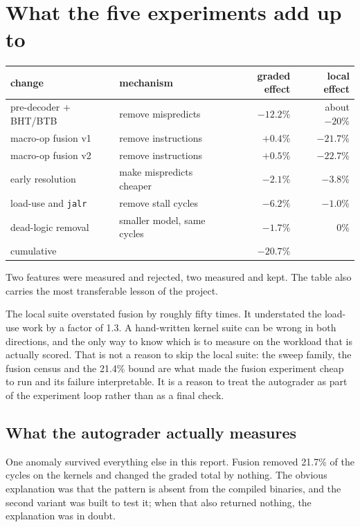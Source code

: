 \documentclass[11pt]{article}
\begin{document}
\section{What the five experiments add up to}

\begin{center}
\small
\setlength{\tabcolsep}{5pt}
\begin{tabular}{llrr}
\toprule
change & mechanism & graded effect & local effect \\
\midrule
pre-decoder + BHT/BTB & remove mispredicts & $-12.2\%$ & about $-20\%$ \\
macro-op fusion v1    & remove instructions & $+0.4\%$ & $-21.7\%$ \\
macro-op fusion v2    & remove instructions & $+0.5\%$ & $-22.7\%$ \\
early resolution      & make mispredicts cheaper & $-2.1\%$ & $-3.8\%$ \\
load-use and \texttt{jalr} & remove stall cycles & $-6.2\%$ & $-1.0\%$ \\
dead-logic removal & smaller model, same cycles & $\mathbf{-1.7\%}$ & $0\%$ \\
\midrule
cumulative & & $\mathbf{-20.7\%}$ & \\
\bottomrule
\end{tabular}
\end{center}

Two features were measured and rejected, two measured and kept. The table also carries the most
transferable lesson of the project.

The local suite overstated fusion by roughly fifty times. It understated the load-use work by a
factor of 1.3. A hand-written kernel suite can be wrong in both directions, and the only way to
know which is to measure on the workload that is actually scored. That is not a reason to skip
the local suite: the sweep family, the fusion census and the 21.4\% bound are what made the
fusion experiment cheap to run and its failure interpretable. It is a reason to treat the
autograder as part of the experiment loop rather than as a final check.

\subsection{What the autograder actually measures}

One anomaly survived everything else in this report. Fusion removed 21.7\% of the cycles on the
kernels and changed the graded total by nothing. The obvious explanation was that the pattern
is absent from the compiled binaries, and the second variant was built to test it; when that
also returned nothing, the explanation was in doubt.
\end{document}
